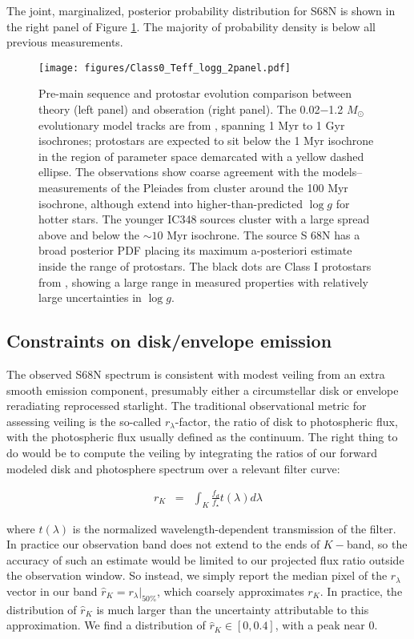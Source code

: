 \documentclass[twocolumn]{emulateapj}%
\begin{document}
The joint, marginalized, posterior probability distribution for S68N is shown in the right panel of Figure \ref{fig:theory_v_obs}.  The majority of probability density is below all previous measurements.


\begin{figure}
 \centering
 \texttt{[image: figures/Class0\_Teff\_logg\_2panel.pdf]}
 \caption{Pre-main sequence and protostar evolution comparison between theory (left panel) and obseration (right panel).  The 0.02$-$1.2 $M_{\odot}$ evolutionary model tracks are from \citet{baraffe15}, spanning 1 Myr to 1 Gyr isochrones; protostars are expected to sit below the 1 Myr isochrone in the region of parameter space demarcated with a yellow dashed ellipse.  The observations show coarse agreement with the models-- measurements of the Pleiades from \citet[green KDE]{cottaar14} cluster around the 100 Myr isochrone, although extend into higher-than-predicted $\log{g}$ for hotter stars.  The younger IC348 sources \citep[purple KDE]{cottaar14} cluster with a large spread above and below the $\sim10$ Myr isochrone.  The source S 68N has a broad posterior PDF placing its maximum a-posteriori estimate inside the range of protostars.  The black dots are Class I protostars from \citet{2005AJ....130.1145D}, showing a large range in measured properties with relatively large uncertainties in $\log{g}$.}  
 \label{fig:theory_v_obs}
\end{figure}


\subsection{Constraints on disk/envelope emission}

The observed S68N spectrum is consistent with modest veiling from an extra smooth emission component, presumably either a circumstellar disk or envelope reradiating reprocessed starlight.  The traditional observational metric for assessing veiling is the so-called $r_\lambda$-factor, the ratio of disk to photospheric flux, with the photospheric flux usually defined as the continuum.  The right thing to do would be to compute the veiling by integrating the ratios of our forward modeled disk and photosphere spectrum over a relevant filter curve:

\begin{eqnarray}
r_{K} &=& \int_{K} \frac{f_{d}}{f_{\star}} t(\lambda) d\lambda
\end{eqnarray}

where $t(\lambda)$ is the normalized wavelength-dependent transmission of the filter.  In practice our observation band does not extend to the ends of $K-$band, so the accuracy of such an estimate would be limited to our projected flux ratio outside the observation window.  So instead, we simply report the median pixel of the $r_\lambda$ vector in our band $\hat r_K = r_\lambda |_{50\%}$, which coarsely approximates $r_K$.  In practice, the distribution of $\hat r_K$ is much larger than the uncertainty attributable to this approximation.  We find a distribution of $\hat r_K \in [0, 0.4]$, with a peak near 0.
\end{document}

